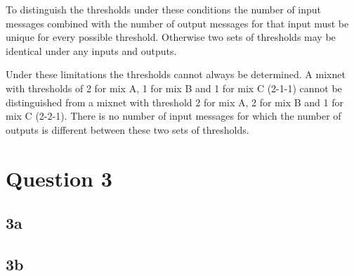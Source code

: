 \documentclass{article}
\begin{document}
To distinguish the thresholds under these conditions the number of input messages combined with the number of output messages for that input must be unique for every possible threshold. Otherwise two sets of thresholds may be identical under any inputs and outputs.

Under these limitations the thresholds cannot always be determined. A mixnet with thresholds of 2 for mix A, 1 for mix B and 1 for mix C (2-1-1) cannot be distinguished from a mixnet with threshold 2 for mix A, 2 for mix B and 1 for mix C (2-2-1). There is no number of input messages for which the number of outputs is different between these two sets of thresholds.

\section*{Question 3}
\subsection*{3a}
\subsection*{3b}
\end{document}
